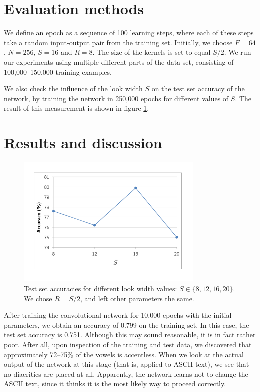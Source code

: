 \documentclass[11pt]{article}
\begin{document}
\section{Evaluation methods}
We define an epoch as a sequence of 100 learning steps, where each of these steps take a random input-output pair from the training set. Initially, we choose $F=64$, $N=256$, $S=16$ and $R=8$. The size of the kernels is set to equal $S/2$. We run our experiments using multiple different parts of the data set, consisting of 100,000--150,000 training examples.\par
We also check the influence of the look width $S$ on the test set accuracy of the network, by training the network in 250,000 epochs for different values of $S$. The result of this measurement is shown in figure \ref{fig:variS}.
\section{Results and discussion}
\begin{figure}[!t]
\centering
\includegraphics[width=0.8\textwidth]{variS.pdf}
\caption{Test set accuracies for different look width values: $S\in\{8, 12, 16, 20\}$. We chose $R=S/2$, and left other parameters the same.}
\label{fig:variS}
\end{figure}
After training the convolutional network for 10,000 epochs with the initial parameters, we obtain an accuracy of 0.799 on the training set. In this case, the test set accuracy is 0.751. Although this may sound reasonable, it is in fact rather poor. After all, upon inspection of the training and test data, we discovered that approximately 72--75\% of the vowels is accentless. When we look at the actual output of the network at this stage (that is, applied to ASCII text), we see that no diacritics are placed at all. Apparently, the network learns not to change the ASCII text, since it thinks it is the most likely way to proceed correctly.\par
\end{document}
